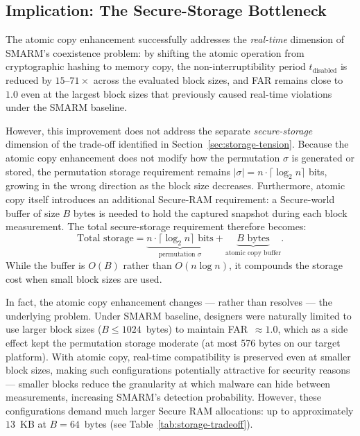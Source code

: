 \documentclass[a4paper,10pt]{article}
\begin{document}
{\subsection{Implication: The Secure-Storage Bottleneck}
\label{sec:atomic-storage-bottleneck}

The atomic copy enhancement successfully addresses the \emph{real-time} 
dimension of SMARM's coexistence problem: by shifting the atomic 
operation from cryptographic hashing to memory copy, the 
non-interruptibility period $t_{\mathrm{disabled}}$ is reduced by 
$15$--$71\times$ across the evaluated block sizes, and FAR remains 
close to $1.0$ even at the largest block sizes that previously caused 
real-time violations under the SMARM baseline.

However, this improvement does not address the separate 
\emph{secure-storage} dimension of the trade-off identified in 
Section~\ref{sec:storage-tension}. Because the atomic copy enhancement 
does not modify how the permutation $\sigma$ is generated or stored, 
the permutation storage requirement remains 
$|\sigma| = n \cdot \lceil \log_2 n \rceil$ bits, growing 
in the wrong direction as the block size decreases. Furthermore, 
atomic copy itself introduces an additional Secure-RAM requirement: 
a Secure-world buffer of size $B$ bytes is needed to hold the 
captured snapshot during each block measurement. The total 
secure-storage requirement therefore becomes:
\begin{equation}
    \text{Total storage} = \underbrace{n \cdot \lceil \log_2 n \rceil 
    \text{ bits}}_{\text{permutation } \sigma} 
    + \underbrace{B \text{ bytes}}_{\text{atomic copy buffer}}.
\end{equation}
While the buffer is $O(B)$ rather than $O(n \log n)$, it 
compounds the storage cost when small block sizes are used.

In fact, the atomic copy enhancement changes — rather than 
resolves — the underlying problem. Under SMARM baseline, designers 
were naturally limited to use larger block sizes 
($B \leq 1024$~bytes) to maintain FAR~$\approx 1.0$, which 
as a side effect kept the permutation storage moderate (at most 576 
bytes on our target platform). With atomic copy, real-time 
compatibility is preserved even at smaller block sizes, making such 
configurations potentially attractive for security reasons — 
smaller blocks reduce the granularity at which malware can hide 
between measurements, increasing SMARM's detection probability. 
However, these configurations demand much larger Secure RAM 
allocations: up to approximately $13$~KB at $B = 64$~bytes (see 
Table~\ref{tab:storage-tradeoff}).

}
\end{document}
